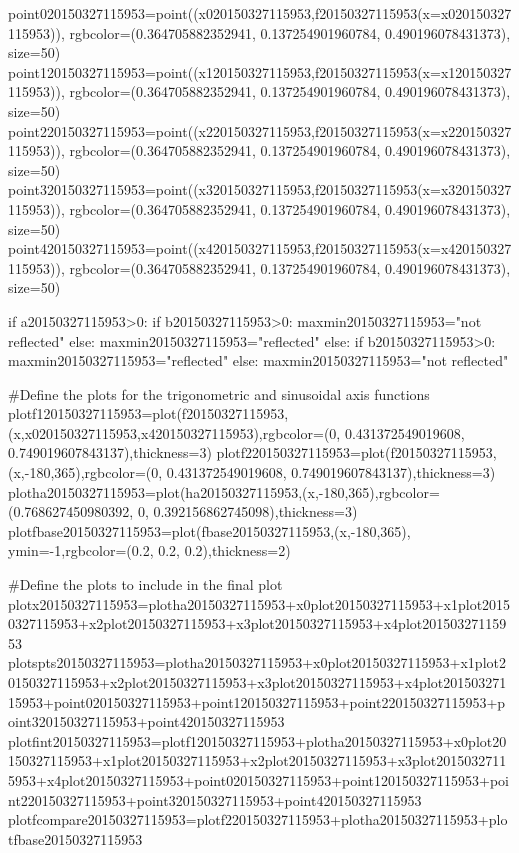 \begin{example}[id:20150327-115953]
\begin{sagesilent}
point020150327115953=point((x020150327115953,f20150327115953(x=x020150327115953)), rgbcolor=(0.364705882352941, 0.137254901960784, 0.490196078431373), size=50)
point120150327115953=point((x120150327115953,f20150327115953(x=x120150327115953)), rgbcolor=(0.364705882352941, 0.137254901960784, 0.490196078431373), size=50)
point220150327115953=point((x220150327115953,f20150327115953(x=x220150327115953)), rgbcolor=(0.364705882352941, 0.137254901960784, 0.490196078431373), size=50)
point320150327115953=point((x320150327115953,f20150327115953(x=x320150327115953)), rgbcolor=(0.364705882352941, 0.137254901960784, 0.490196078431373), size=50)
point420150327115953=point((x420150327115953,f20150327115953(x=x420150327115953)), rgbcolor=(0.364705882352941, 0.137254901960784, 0.490196078431373), size=50)

if a20150327115953>0:
    if b20150327115953>0:
        maxmin20150327115953="not reflected"
    else:
        maxmin20150327115953="reflected"
else:
    if b20150327115953>0:
        maxmin20150327115953="reflected"
    else:
        maxmin20150327115953="not reflected"
    
#Define the plots for the trigonometric and sinusoidal axis functions
plotf120150327115953=plot(f20150327115953,(x,x020150327115953,x420150327115953),rgbcolor=(0, 0.431372549019608, 0.749019607843137),thickness=3)
plotf220150327115953=plot(f20150327115953,(x,-180,365),rgbcolor=(0, 0.431372549019608, 0.749019607843137),thickness=3)
plotha20150327115953=plot(ha20150327115953,(x,-180,365),rgbcolor=(0.768627450980392, 0, 0.392156862745098),thickness=3)
plotfbase20150327115953=plot(fbase20150327115953,(x,-180,365), ymin=-1,rgbcolor=(0.2, 0.2, 0.2),thickness=2)

#Define the plots to include in the final plot
plotx20150327115953=plotha20150327115953+x0plot20150327115953+x1plot20150327115953+x2plot20150327115953+x3plot20150327115953+x4plot20150327115953
plotspts20150327115953=plotha20150327115953+x0plot20150327115953+x1plot20150327115953+x2plot20150327115953+x3plot20150327115953+x4plot20150327115953+point020150327115953+point120150327115953+point220150327115953+point320150327115953+point420150327115953
plotfint20150327115953=plotf120150327115953+plotha20150327115953+x0plot20150327115953+x1plot20150327115953+x2plot20150327115953+x3plot20150327115953+x4plot20150327115953+point020150327115953+point120150327115953+point220150327115953+point320150327115953+point420150327115953
plotfcompare20150327115953=plotf220150327115953+plotha20150327115953+plotfbase20150327115953


\end{sagesilent}
\end{example}
